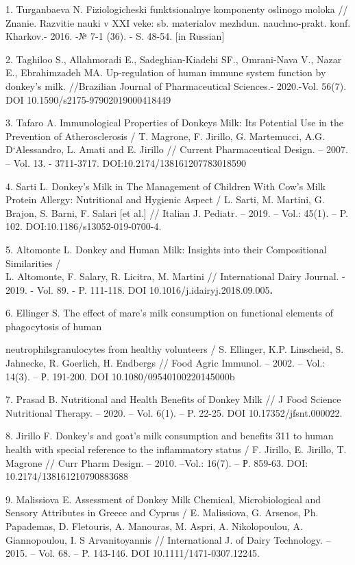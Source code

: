 \begin{noparindent}
1. Turganbaeva N. Fiziologicheski funktsional\textquotesingle nye
komponenty oslinogo moloka // Znanie. Razvitie nauki v XXI veke: sb.
materialov mezhdun. nauchno-prakt. konf. Khar\textquotesingle kov.-
2016. -№ 7-1 (36). - S. 48-54. {[}in Russian{]}

2. Taghiloo S., Allahmoradi E., Sadeghian-Kiadehi SF., Omrani-Nava V.,
Nazar E., Ebrahimzadeh MA. Up-regulation of human immune system function
by donkey's milk. //Brazilian Journal of Pharmaceutical Sciences.-
2020.-Vol. 56(7). DOI 10.1590/s2175-97902019000418449

3. Tafaro A. Immunological Properties of Donkeys Milk: Its Potential Use
in the Prevention of Atherosclerosis / T. Magrone, F. Jirillo, G.
Martemucci, A.G. D`Alessandro, L. Amati and E. Jirillo // Current
Pharmaceutical Design. -- 2007. -- Vol. 13. - 3711-3717.
DOI:10.2174/138161207783018590

4. Sarti L. Donkey's Milk in The Management of Children With Cow's Milk
Protein Allergy: Nutritional and Hygienic Aspect / L. Sarti, M. Martini,
G. Brajon, S. Barni, F. Salari {[}et al.{]} // Italian J. Pediatr. --
2019. -- Vol.: 45(1). -- P. 102. DOI:10.1186/s13052-019-0700-4.

5. Altomonte L. Donkey and Human Milk: Insights into their Compositional
Similarities /\\
L. Altomonte, F. Salary, R. Licitra, M. Martini // International Dairy
Journal. - 2019. - Vol. 89. - P. 111-118. DOI
10.1016/j.idairyj.2018.09.005{\bfseries .}

6. Ellinger S. The effect of mare's milk consumption on functional
elements of phagocytosis of human

neutrophilsgranulocytes from healthy
volunteers / S. Ellinger, K.P. Linscheid, S. Jahnecke, R. Goerlich, H.
Endbergs // Food Agric Immunol. -- 2002. -- Vol.: 14(3). -- Р. 191-200.
DOI 10.1080/09540100220145000b

7. Prasad B. Nutritional and Health Benefits of Donkey Milk // J Food
Science Nutritional Therapy. -- 2020. -- Vol. 6(1). -- P. 22-25. DOI
10.17352/jfsnt.000022.

8. Jirillo F. Donkey's and goat's milk consumption and benefits 311 to
human health with special reference to the inflammatory status / F.
Jirillo, E. Jirillo, T. Magrone // Curr Pharm Design. -- 2010. --Vol.:
16(7). -- Р. 859-63. DOI: 10.2174/138161210790883688

9. Malissiova E. Assessment of Donkey Milk Chemical, Microbiological and
Sensory Attributes in Greece and Cyprus / E. Malissiova, G. Arsenos, Ph.
Papademas, D. Fletouris, A. Manouras, M. Aspri, A. Nikolopoulou, A.
Giannopoulou, I. S Arvanitoyannis // International J. of Dairy
Technology. -- 2015. -- Vol. 68. -- P. 143-146. DOI
10.1111/1471-0307.12245.


\end{noparindent}

